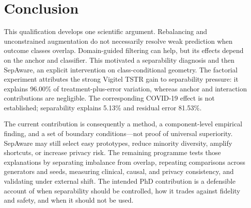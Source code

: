 \chapter{Conclusion}
\label{chap:conclusion}

\begin{sloppypar}
This qualification develops one scientific argument. Rebalancing and unconstrained augmentation do not necessarily resolve weak prediction when outcome classes overlap. Domain-guided filtering can help, but its effects depend on the anchor and classifier. This motivated a separability diagnosis and then SepAware, an explicit intervention on class-conditional geometry. The factorial experiment attributes the strong Vigitel TSTR gain to separability pressure: it explains 96.00\% of treatment-plus-error variation, whereas anchor and interaction contributions are negligible. The corresponding COVID-19 effect is not established; separability explains 5.13\% and residual error 81.53\%.

The current contribution is consequently a method, a component-level empirical finding, and a set of boundary conditions---not proof of universal superiority. SepAware may still select easy prototypes, reduce minority diversity, amplify shortcuts, or increase privacy risk. The remaining programme tests those explanations by separating imbalance from overlap, repeating comparisons across generators and seeds, measuring clinical, causal, and privacy consistency, and validating under external shift. The intended PhD contribution is a defensible account of when separability should be controlled, how it trades against fidelity and safety, and when it should not be used.
\end{sloppypar}
